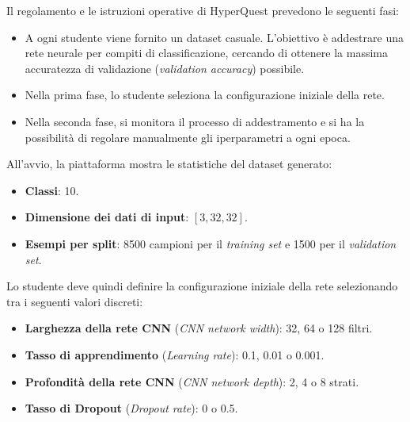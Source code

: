 ﻿\documentclass[11pt, a4paper]{article}
\begin{document}

Il regolamento e le istruzioni operative di HyperQuest prevedono le seguenti fasi:
\begin{itemize}
    \item A ogni studente viene fornito un dataset casuale. L'obiettivo è addestrare una rete neurale per compiti di classificazione, cercando di ottenere la massima accuratezza di validazione (\emph{validation accuracy}) possibile.
    \item Nella prima fase, lo studente seleziona la configurazione iniziale della rete.
    \item Nella seconda fase, si monitora il processo di addestramento e si ha la possibilità di regolare manualmente gli iperparametri a ogni epoca.
\end{itemize}


All'avvio, la piattaforma mostra le statistiche del dataset generato:
\begin{itemize}
    \item \textbf{Classi}: 10.
    \item \textbf{Dimensione dei dati di input}: $[3, 32, 32]$.
    \item \textbf{Esempi per split}: 8500 campioni per il \emph{training set} e 1500 per il \emph{validation set}.
\end{itemize}

Lo studente deve quindi definire la configurazione iniziale della rete selezionando tra i seguenti valori discreti:
\begin{itemize}
    \item \textbf{Larghezza della rete CNN} (\emph{CNN network width}): 32, 64 o 128 filtri.
    \item \textbf{Tasso di apprendimento} (\emph{Learning rate}): 0.1, 0.01 o 0.001.
    \item \textbf{Profondità della rete CNN} (\emph{CNN network depth}): 2, 4 o 8 strati.
    \item \textbf{Tasso di Dropout} (\emph{Dropout rate}): 0 o 0.5.
\end{itemize}

\end{document}
